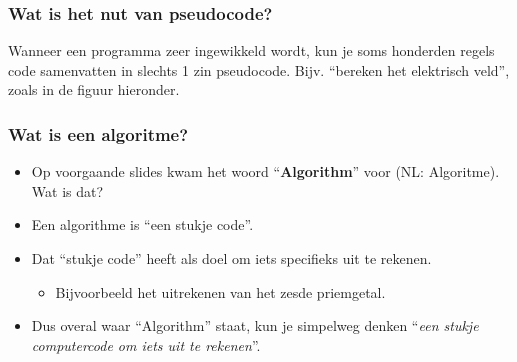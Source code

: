 \begin{frame}
\frametitle{Wat is het nut van pseudocode?}

Wanneer een programma zeer ingewikkeld wordt, kun je soms honderden regels code samenvatten in slechts 1 zin pseudocode.
Bijv. ``bereken het elektrisch veld'', zoals in de figuur hieronder.


\end{frame}


\begin{frame}
\frametitle{Wat is een algoritme?}

\begin{itemize}
  \item<1-> Op voorgaande slides kwam het woord ``\textbf{Algorithm}'' voor (NL: Algoritme). Wat is dat?
  \item<2-> Een algorithme is ``een stukje code''.
  \item<3-> Dat ``stukje code'' heeft als doel om iets specifieks uit te rekenen.
  \begin{itemize}
    \item<4-> Bijvoorbeeld het uitrekenen van het zesde priemgetal.
  \end{itemize}
  \item<5-> Dus overal waar ``Algorithm'' staat, kun je simpelweg denken ``\emph{een stukje computercode om iets uit te rekenen}''.
\end{itemize}

\end{frame}



